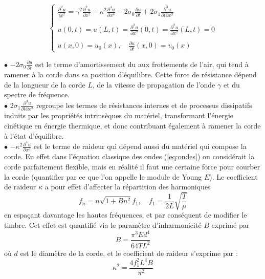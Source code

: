 \documentclass[a4,12pt]{article}
\begin{document}
\begin{equation} 
\left\{
	\begin{array}{l}
		\displaystyle \frac{\partial^2 u}{\partial t^2}=\gamma^2 \frac{\partial^2 u}{\partial x^2}-\kappa^2  				\frac{\partial^4 u}{\partial x^4}-2\sigma_0  \frac{\partial u}{\partial t}+2\sigma_1  \frac{\partial^3 u}{\partial t		\partial x^2}\\ \\ 
		\displaystyle u(0,t)=u(L,t)=\frac{\partial^2 u}{\partial x^2}(0,t)=\frac{\partial^2 u}{\partial x^2}(L,t)=0\\ \\  		\displaystyle u(x,0)=u_0(x), \quad \frac{\partial u}{\partial t}(x,0)=v_0(x)
	\end{array}
\right. 
\label{eq:model_stiff}
\end{equation}

$\bullet$ $\displaystyle -2\sigma_0  \frac{\partial u}{\partial t}$ est le terme d'amortissement du aux frottements de l'air, qui tend à ramener à la corde dans sa position d'équilibre. Cette force de résistance dépend de la longueur de la corde $L$, de la vitesse de propagation de l'onde $\gamma$ et du spectre de fréquence.\\

$\bullet$ $\displaystyle2\sigma_1  \frac{\partial^3 u}{\partial t\partial x^2}$ regroupe les termes de résistances internes et de processus dissipatifs induits par les propriétés intrinsèques du matériel, transformant l'énergie cinétique en énergie thermique, et donc contribuant également à ramener la corde à l'état d'équilibre.\\

$\bullet$ $\displaystyle-\kappa^2  \frac{\partial^4 u}{\partial x^4}$ est le terme de raideur qui dépend aussi du matériel qui compose la corde. En effet dans l'équation classique des ondes (\ref{eq:ondes}) on considérait la corde parfaitement flexible, mais en réalité il faut une certaine force pour courber la corde (quantifier par ce que l'on appelle le module de Young $E$). Le coefficient de raideur $\kappa$ a pour effet d'affecter la répartition des harmoniques 
\[
f_n = n \sqrt{1 + B n^2}f_1,\quad f_1=\frac{1}{2 L} \sqrt{\frac{T}{\mu}}
\]
en espaçant davantage les hautes fréquences, et par conséquent de modifier le timbre. Cet effet est quantifié via le paramètre d'inharmonicité $B$ exprimé par 
\[
B = \frac{\pi^3 E d^4}{64 T L^2}
\]
où $d$ est le diamètre de la corde, et le coefficient de raideur s'exprime par : 
\[
\kappa^2=\frac{4f_1^2L^4B}{\pi^2}
\]
\end{document}

